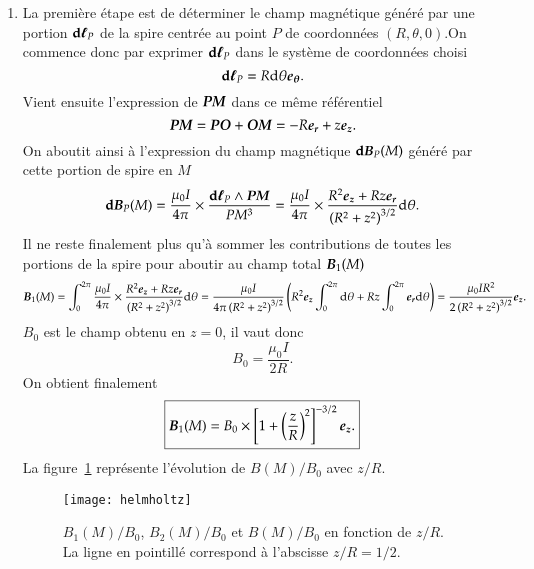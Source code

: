 \begin{corrige}
\begin{enumerate}
		\item La première étape est de déterminer le champ magnétique généré
		  par une portion $\dl_P$ de la spire centrée au point $P$
		  de coordonnées $(R, \theta, 0)$.On commence donc par exprimer $\dl_P$ 
		  dans le système de coordonnées choisi
		  \begin{equation*}
			  \dl_P = R \dtheta \etheta.
		  \end{equation*}
		  Vient ensuite l'expression de $\mitbf{PM}$ 
		  dans ce même référentiel
		  \begin{equation*}
			  \mitbf{PM} = \mitbf{PO} + \mitbf{OM} = -R \er + z\ez.
		  \end{equation*}
		  On aboutit ainsi à l'expression du champ magnétique $
		  \mathrm{\textbf{d}}\vecb_P(M)$
		  généré par cette portion de spire en $M$
		  \begin{equation*}
			  \mathrm{\textbf{d}}\vecb_P(M) = \dfrac{\mu_0 I}{4 \pi} \times 
			  \dfrac{\dl_P \wedge \mitbf{PM}}{PM^3}
			  = \dfrac{\mu_0 I}{4 \pi} \times \dfrac{R^2\ez + Rz\er}
			  {\left(R^2 + z^2\right)^{3/2}} \dtheta.
		  \end{equation*}
		  Il ne reste finalement plus qu'à sommer les contributions 
		  de toutes les portions de la spire pour aboutir au champ total
		  $\vecb_1(M)$
		  \begin{equation*}
			  \vecb_1(M) = \int_0^{2\pi} \dfrac{\mu_0 I}{4 \pi} \times 
			  \dfrac{R^2\ez + Rz\er}
			  {\left(R^2 + z^2\right)^{3/2}} \dtheta
			  = \dfrac{\mu_0 I}{4 \pi\left(R^2 + z^2\right)^{3/2}} 
			  \left(
		            R^2\ez  
		    \int_0^{2\pi}\dtheta + Rz \int_0^{2\pi} \er \dtheta
		     \right)
		     = \dfrac{\mu_0 I R^2}{2 \left(R^2 + z^2\right)^{3/2}}\ez.
		  \end{equation*}
		  $B_0$ est le champ obtenu en $z = 0$, il vaut donc
		  \begin{equation*}
			  B_0 = \dfrac{\mu_0 I}{2 R}.
		  \end{equation*}
		  On obtient finalement
		  \begin{equation*}
			  \boxed{\vecb_1(M) = B_0 \times 
			  \left[1 + \left(\dfrac{z}{R}\right)^2\right]^{-3/2}\ez.}
		  \end{equation*}
		  La figure~\ref{fig:helmholtz} représente l'évolution de 
		  $B(M)/B_0$ avec $z/R$.
		  \begin{figure}[htpb]
		  	\centering
			\texttt{[image: helmholtz]}
			\caption{$B_1(M)/B_0$, $B_2(M)/B_0$ et $B(M)/B_0$ 
			         en fonction de $z/R$. La ligne en pointillé correspond
			 à l'abscisse $z/R = 1/2$.}%
			\label{fig:helmholtz}
		  \end{figure}


\end{enumerate}
\end{corrige}

